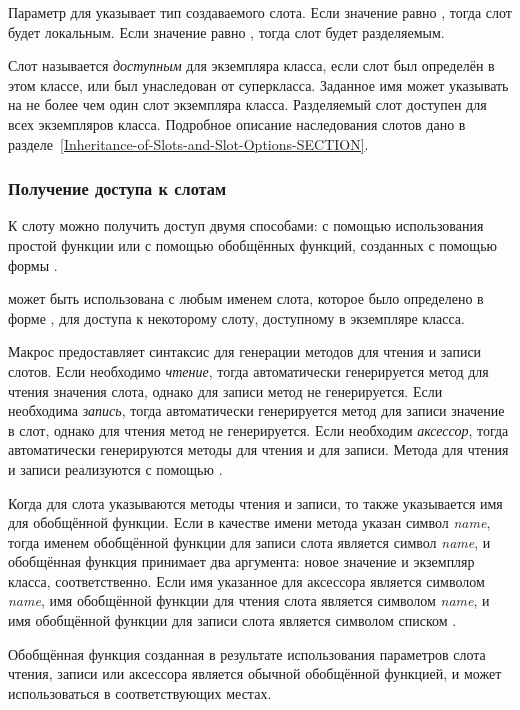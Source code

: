 Параметр  для  указывает тип создаваемого слота.
Если значение  равно , тогда слот будет
локальным. Если значение  равно , тогда слот будет
разделяемым.

Слот называется \emph{доступным} для экземпляра класса, если слот был определён
в этом классе, или был унаследован от суперкласса. Заданное имя может указывать
на не более чем один слот экземпляра класса. Разделяемый слот доступен для всех
экземпляров класса. Подробное описание наследования слотов дано в
разделе~\ref{Inheritance-of-Slots-and-Slot-Options-SECTION}.

\subsubsection{Получение доступа к слотам}

К слоту можно получить доступ двумя способами: с помощью использования простой
функции  или с помощью обобщённых функций, созданных с помощью
формы .

 может быть использована с любым именем слота, которое было
определено в форме , для доступа к некоторому слоту,
доступному в экземпляре класса. 

Макрос  предоставляет синтаксис для генерации методов для чтения и
записи слотов. Если необходимо \emph{чтение}, тогда автоматически генерируется
метод для чтения значения слота, однако для записи метод не генерируется. Если
необходима \emph{запись}, тогда автоматически генерируется метод для записи
значение в слот, однако для чтения метод не генерируется. Если необходим
\emph{аксессор}, тогда автоматически генерируются методы для чтения и для
записи. Метода для чтения и записи реализуются с помощью .

Когда для слота указываются методы чтения и записи, то также указывается имя для
обобщённой функции. Если в качестве имени метода указан символ \emph{name},
тогда именем обобщённой функции для записи слота является символ \emph{name}, и
обобщённая функция принимает два аргумента: новое значение и экземпляр класса,
соответственно. Если имя указанное для аксессора является символом \emph{name},
имя обобщённой функции для чтения слота является символом \emph{name}, и имя
обобщённой функции для записи слота является символом списком .

Обобщённая функция созданная в результате использования параметров слота чтения,
записи или аксессора является обычной обобщённой функцией, и может
использоваться в соответствующих местах.

